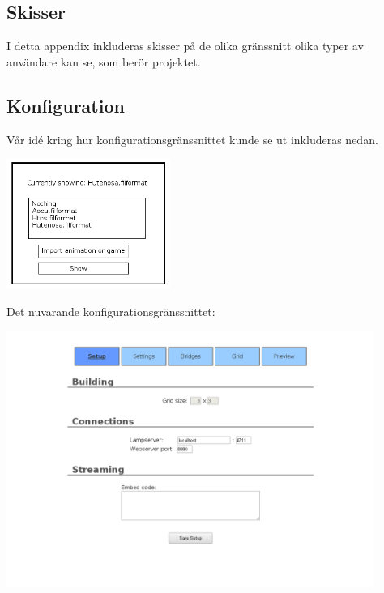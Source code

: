 \documentclass[a4paper,11pt]{article}
\begin{document}
\begin{appendices}
\newpage
\section{Skisser}

  I detta appendix inkluderas skisser på de olika gränssnitt olika typer av
  användare kan se, som berör projektet.

\subsection{Konfiguration}
  Vår idé kring hur konfigurationsgränssnittet kunde se ut inkluderas nedan.

  \begin{center}
    \includegraphics[width=0.4\textwidth]{images/sketch-config.png}
  \end{center}

  Det nuvarande konfigurationsgränssnittet:

  \begin{center}
    \includegraphics[width=0.9\textwidth]{sepdata1.png}
  \end{center}


\end{appendices}
\end{document}
